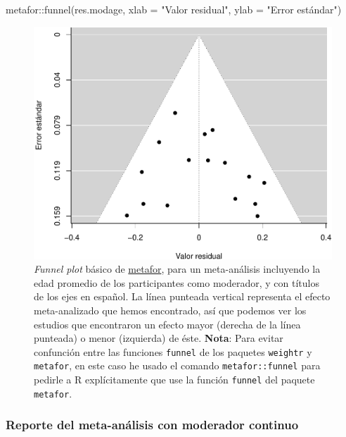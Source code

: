 \documentclass[
  bookmarksnumbered]{article}
\newenvironment{Shaded}{\begin{snugshade}}{\end{snugshade}}
\newcommand{\AttributeTok}[1]{\textcolor[rgb]{0.00,0.34,0.68}{#1}}
\newcommand{\FunctionTok}[1]{\textcolor[rgb]{0.39,0.29,0.61}{#1}}
\newcommand{\NormalTok}[1]{\textcolor[rgb]{0.12,0.11,0.11}{#1}}
\newcommand{\SpecialCharTok}[1]{\textcolor[rgb]{0.24,0.68,0.91}{#1}}
\newcommand{\StringTok}[1]{\textcolor[rgb]{0.75,0.01,0.01}{#1}}
\begin{document}
\begin{Shaded}
\begin{Highlighting}[]
\NormalTok{metafor}\SpecialCharTok{::}\FunctionTok{funnel}\NormalTok{(res.modage,}
                \AttributeTok{xlab =} \StringTok{"Valor residual"}\NormalTok{,}
                \AttributeTok{ylab =} \StringTok{"Error estándar"}\NormalTok{)}
\end{Highlighting}
\end{Shaded}

\begin{figure}
\centering
\includegraphics{Meta-analysis_files/figure-latex/funnel-plot-mod1-1.pdf}
\caption{\label{fig:funnel-plot-mod1}\emph{Funnel plot} básico de \href{https://www.metafor-project.org/doku.php}{metafor}, para un meta-análisis incluyendo la edad promedio de los participantes como moderador, y con títulos de los ejes en español. La línea punteada vertical representa el efecto meta-analizado que hemos encontrado, así que podemos ver los estudios que encontraron un efecto mayor (derecha de la línea punteada) o menor (izquierda) de éste. \textbf{Nota}: Para evitar confunción entre las funciones \texttt{funnel} de los paquetes \texttt{weightr} y \texttt{metafor}, en este caso he usado el comando \texttt{metafor::funnel} para pedirle a R explícitamente que use la función \texttt{funnel} del paquete \texttt{metafor}.}
\end{figure}

\hypertarget{reporte-cont}{%
\subsubsection{Reporte del meta-análisis con moderador continuo}\label{reporte-cont}}
\end{document}
